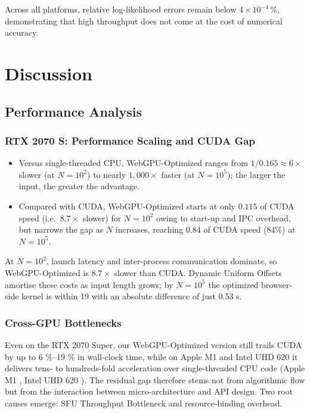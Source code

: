 \documentclass[PhD]{PHlab-thesis}
\begin{document}
Across all platforms, relative log-likelihood errors remain below $4\times10^{-4}\,\%$, demonstrating that high throughput does not come at the cost of numerical accuracy.  






\chapter{Discussion}

\section{Performance Analysis}
\subsection{RTX 2070 S: Performance Scaling and CUDA Gap}  
\begin{itemize}
  \item Versus single-threaded CPU, WebGPU-Optimized ranges from
        $1/0.165 \approx 6\times$ slower (at $N=10^{2}$) to nearly
        $1{,}000\times$ faster (at $N=10^{5}$); the larger the input,
        the greater the advantage.
  \item Compared with CUDA, WebGPU-Optimized starts at only
        $0.115$ of CUDA speed (i.e.\ $8.7\times$ slower) for
        $N=10^{2}$ owing to start-up and IPC overhead, but
        narrows the gap as $N$ increases, reaching
        $0.84$ of CUDA speed (84\%) at $N=10^{5}$.
\end{itemize}

At $N=10^{2}$, launch latency and inter-process communication dominate,
so WebGPU-Optimized is $8.7\times$ slower than CUDA.  
Dynamic Uniform Offsets amortise these costs as input length grows;
by $N=10^{5}$ the optimized browser-side kernel is within 19 %
with an absolute difference of just 0.53 s.

\subsection{Cross-GPU Bottlenecks}
Even on the RTX 2070 Super, our WebGPU-Optimized version still trails CUDA by up to 6 \%–19 \% in wall-clock time, while on Apple M1 and Intel UHD 620 it delivers tens- to hundreds-fold acceleration over single-threaded CPU code (Apple M1 \cite{Apple2020-m1}, Intel UHD 620 \cite{Intel2018-uhd620}). The residual gap therefore stems not from algorithmic flow but from the interaction between micro-architecture and API design. Two root causes emerge: SFU Throughput Bottleneck and resource-binding overhead.
\end{document}
